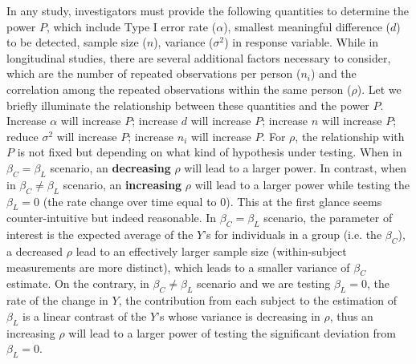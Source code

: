 \documentclass[12pt]{article}
\begin{document}
In any study, investigators must provide the following quantities to determine the power $P$, which include Type I error rate ($\alpha$), smallest meaningful difference ($d$) to be detected, sample size ($n$), variance ($\sigma^2$) in response variable. While in longitudinal studies, there are several additional factors necessary to consider, which are the number of repeated observations per person ($n_i$) and the correlation among the repeated observations within the same person ($\rho$). Let we briefly illuminate the relationship between these quantities and the power $P$. Increase $\alpha$ will increase $P$; increase $d$ will increase $P$; increase $n$ will increase $P$; reduce $\sigma^2$ will increase $P$; increase $n_i$ will increase $P$. For $\rho$, the relationship with $P$ is not fixed but depending on what kind of hypothesis under testing. When in $\beta_C = \beta_L$ scenario, an \textbf{decreasing} $\rho$ will lead to a larger power. In contrast, when in $\beta_C \neq \beta_L$ scenario, an \textbf{increasing} $\rho$ will lead to a larger power while testing the $\beta_L = 0$ (the rate change over time equal to 0). This at the first glance seems counter-intuitive but indeed reasonable. In $\beta_C = \beta_L$ scenario, the parameter of interest is the expected average of the $Y$'s for individuals in a group (i.e. the $\beta_C$), a decreased $\rho$ lead to an effectively larger sample size (within-subject measurements are more distinct), which leads to a smaller variance of $\beta_C$ estimate. On the contrary, in $\beta_C \neq \beta_L$ scenario and we are testing $\beta_L = 0$,   the rate of the change in $Y$, the contribution from each subject to the estimation of $\beta_L$ is a linear contrast of the $Y$'s whose variance is decreasing in $\rho$, thus an increasing $\rho$ will lead to a larger power of testing the significant deviation from $\beta_L = 0$.
  
\end{document}
